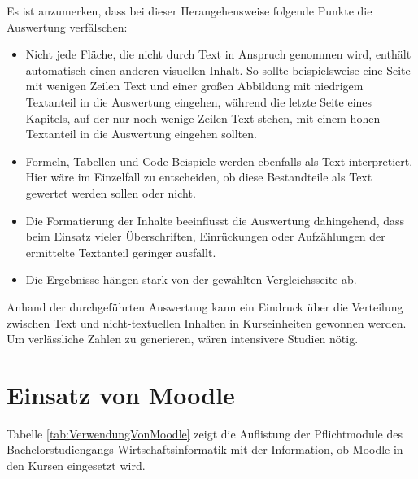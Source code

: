 Es ist anzumerken, dass bei dieser Herangehensweise folgende Punkte die Auswertung verfälschen:
\begin{itemize}
\item Nicht jede Fläche, die nicht durch Text in Anspruch genommen wird, enthält automatisch einen anderen visuellen Inhalt. So sollte beispielsweise eine Seite mit wenigen Zeilen Text und einer großen Abbildung mit niedrigem Textanteil in die Auswertung eingehen, während die letzte Seite eines Kapitels, auf der nur noch wenige Zeilen Text stehen, mit einem hohen Textanteil in die Auswertung eingehen sollten.
\item Formeln, Tabellen und Code-Beispiele werden ebenfalls als Text interpretiert. Hier wäre im Einzelfall zu entscheiden, ob diese Bestandteile als Text gewertet werden sollen oder nicht.
\item Die Formatierung der Inhalte beeinflusst die Auswertung dahingehend, dass beim Einsatz vieler Überschriften, Einrückungen oder Aufzählungen der ermittelte Textanteil geringer ausfällt.
\item Die Ergebnisse hängen stark von der gewählten Vergleichsseite ab.
\end{itemize}

Anhand der durchgeführten Auswertung kann ein Eindruck über die Verteilung zwischen Text und nicht-textuellen Inhalten in Kurseinheiten gewonnen werden. Um verlässliche Zahlen zu generieren, wären intensivere Studien nötig.

\FloatBarrier

\section{Einsatz von Moodle}
\label{sec:EinsatzVonMoodle}
Tabelle \ref{tab:VerwendungVonMoodle} zeigt die Auflistung der Pflichtmodule des Bachelorstudiengangs Wirtschaftsinformatik mit der Information, ob Moodle in den Kursen eingesetzt wird.


